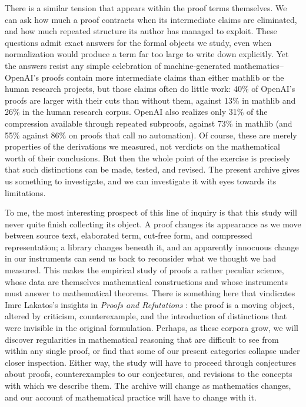 \documentclass{article}
\begin{document}
There is a similar tension that appears within the proof terms themselves. We can ask how much a proof contracts when 
its intermediate claims are eliminated, and how much repeated structure its author has managed to exploit. These questions 
admit exact answers for the formal objects we study, even when normalization would produce a term far too large to write 
down explicitly. Yet the answers resist any simple celebration of machine-generated mathematics--OpenAI's proofs contain 
more intermediate claims than either mathlib or the human research projects, but those claims often do little work: 
40\% of OpenAI's proofs are larger with their cuts than without them, against 13\% in mathlib and 26\% in the human 
research corpus. OpenAI also realizes only 31\% of the compression available through repeated subproofs, against 73\% 
in mathlib (and 55\% against 86\% on proofs that call no automation). Of course, these are merely properties of the derivations we measured, not verdicts on the mathematical worth of their 
conclusions. But then the whole point of the exercise is precisely that such distinctions can be made, tested, and revised. 
The present archive gives us something to investigate, and we can investigate it with eyes towards its limitations.

To me, the most interesting prospect of this line of inquiry is that this study will never quite finish collecting its 
object. A proof changes its appearance as we move between source text, elaborated term, cut-free form, and compressed 
representation; a library changes beneath it, and an apparently innocuous change in our instruments can send us back 
to reconsider what we thought we had measured. This makes the empirical study of proofs a rather peculiar science, 
whose data are themselves mathematical constructions and whose instruments must answer to mathematical theorems. 
There is something here that vindicates Imre Lakatos's insights in \textit{Proofs and Refutations} \textit{\parencite{lakatos1976}}: the proof is a moving 
object, altered by criticism, counterexample, and the introduction of distinctions that were invisible in the original 
formulation. Perhaps, as these corpora grow, we will discover regularities in mathematical reasoning that are difficult 
to see from within any single proof, or find that some of our present categories collapse under closer inspection. Either 
way, the study will have to proceed through conjectures about proofs, counterexamples to our conjectures, and revisions 
to the concepts with which we describe them. The archive will change as mathematics changes, and our account of 
mathematical practice will have to change with it.

\printbibliography[category=cited,heading=bibintoc,title={References}]
\nocite{*}
\printbibliography[notcategory=cited,heading=bibintoc,title={Further related work}]
\end{document}
